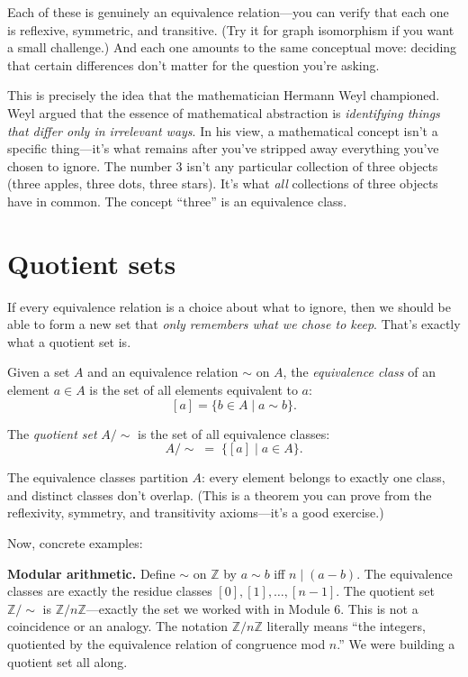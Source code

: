 \documentclass[11pt]{article}
\begin{document}
Each of these is genuinely an equivalence relation---you can verify that each one is reflexive, symmetric, and transitive. (Try it for graph isomorphism if you want a small challenge.) And each one amounts to the same conceptual move: deciding that certain differences don't matter for the question you're asking.

This is precisely the idea that the mathematician Hermann Weyl championed. Weyl argued that the essence of mathematical abstraction is \emph{identifying things that differ only in irrelevant ways}. In his view, a mathematical concept isn't a specific thing---it's what remains after you've stripped away everything you've chosen to ignore. The number 3 isn't any particular collection of three objects (three apples, three dots, three stars). It's what \emph{all} collections of three objects have in common. The concept ``three'' is an equivalence class.

\section{Quotient sets}

If every equivalence relation is a choice about what to ignore, then we should be able to form a new set that \emph{only remembers what we chose to keep}. That's exactly what a quotient set is.

\begin{definition}
Given a set $A$ and an equivalence relation $\sim$ on $A$, the \emph{equivalence class} of an element $a \in A$ is the set of all elements equivalent to $a$:
\[
  [a] = \{b \in A \mid a \sim b\}.
\]
\end{definition}

\begin{definition}
The \emph{quotient set} $A / {\sim}$ is the set of all equivalence classes:
\[
  A / {\sim} \;=\; \{ [a] \mid a \in A \}.
\]
\end{definition}

The equivalence classes partition $A$: every element belongs to exactly one class, and distinct classes don't overlap. (This is a theorem you can prove from the reflexivity, symmetry, and transitivity axioms---it's a good exercise.)

Now, concrete examples:

\medskip

\textbf{Modular arithmetic.} Define $\sim$ on $\mathbb{Z}$ by $a \sim b$ iff $n \mid (a - b)$. The equivalence classes are exactly the residue classes $[0], [1], \ldots, [n-1]$. The quotient set $\mathbb{Z} / {\sim}$ is $\mathbb{Z}/n\mathbb{Z}$---exactly the set we worked with in Module 6. This is not a coincidence or an analogy. The notation $\mathbb{Z}/n\mathbb{Z}$ literally means ``the integers, quotiented by the equivalence relation of congruence mod $n$.'' We were building a quotient set all along.
\end{document}

